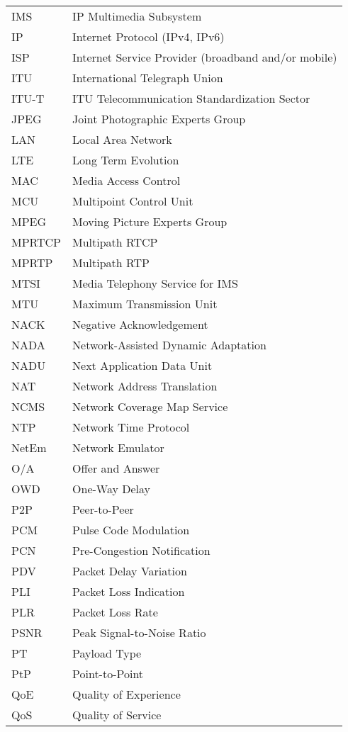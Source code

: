 \begin{longtable}{ll}
IMS 	& IP Multimedia Subsystem \\
IP  	& Internet Protocol (IPv4, IPv6)\\
ISP 	& Internet Service Provider (broadband and/or mobile) \\
ITU 	& International Telegraph Union \\
ITU-T 	& ITU Telecommunication Standardization Sector \\
JPEG 	& Joint Photographic Experts Group \\
LAN 	& Local Area Network \\
LTE 	& Long Term Evolution \\
MAC 	& Media Access Control \\
MCU 	& Multipoint Control Unit \\
MPEG 	& Moving Picture Experts Group \\
MPRTCP	& Multipath RTCP \\
MPRTP 	& Multipath RTP \\
MTSI 	& Media Telephony Service for IMS\\
MTU  	& Maximum Transmission Unit \\
NACK 	& Negative Acknowledgement \\
NADA 	& Network-Assisted Dynamic Adaptation \\
NADU 	& Next Application Data Unit \\
NAT 	& Network Address Translation \\
NCMS 	& Network Coverage Map Service\\
NTP  	& Network Time Protocol \\
NetEm 	& Network Emulator \\
O/A  	& Offer and Answer \\
OWD 	& One-Way Delay \\
P2P 	& Peer-to-Peer \\
PCM 	& Pulse Code Modulation \\
PCN 	& Pre-Congestion Notification \\
PDV 	& Packet Delay Variation \\
PLI 	& Packet Loss Indication \\
PLR 	& Packet Loss Rate \\
PSNR	& Peak Signal-to-Noise Ratio \\
PT  	& Payload Type \\
PtP 	& Point-to-Point \\
QoE 	& Quality of Experience \\
QoS 	& Quality of Service \\

\end{longtable}
